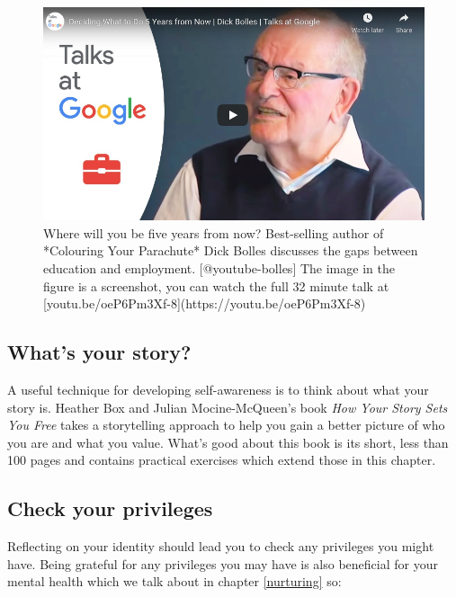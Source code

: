 \documentclass[
]{book}
\begin{document}
\begin{figure}

{\centering \includegraphics[width=0.99\linewidth]{images/youtube-bolles} 

}

\caption{Where will you be five years from now? Best-selling author of *Colouring Your Parachute* Dick Bolles discusses the gaps between education and employment. [@youtube-bolles] The image in the figure is a screenshot, you can watch the full 32 minute talk at [youtu.be/oeP6Pm3Xf-8](https://youtu.be/oeP6Pm3Xf-8) }\label{fig:bolles-fig}
\end{figure}

\hypertarget{freeyourstory}{%
\subsection{What's your story?}\label{freeyourstory}}

A useful technique for developing self-awareness is to think about what your story is. Heather Box and Julian Mocine-McQueen's book \emph{How Your Story Sets You Free} \citep{freeyourstory} takes a storytelling approach to help you gain a better picture of who you are and what you value. What's good about this book is its short, less than 100 pages and contains practical exercises which extend those in this chapter.

\hypertarget{privileged}{%
\subsection{Check your privileges}\label{privileged}}

Reflecting on your identity should lead you to check any privileges you might have. Being grateful for any privileges you may have is also beneficial for your mental health which we talk about in chapter \ref{nurturing} so:
\end{document}
